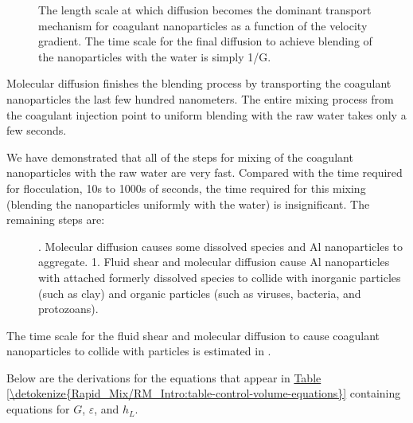 \documentclass[letterpaper,10pt,english]{sphinxmanual}
\let\sphinxpxdimen\pdfpxdimen\else\newdimen\sphinxpxdimen
\begin{document}
\begin{figure}[htbp]
\centering
\capstart

\noindent\sphinxincludegraphics[width=400\sphinxpxdimen]{{Shear_diffusion_length_scale}.png}
\caption{The length scale at which diffusion becomes the dominant transport mechanism for coagulant nanoparticles as a function of the velocity gradient. The time scale for the final diffusion to achieve blending of the nanoparticles with the water is simply 1/G.}\label{\detokenize{Rapid_Mix/RM_Derivations:id5}}\label{\detokenize{Rapid_Mix/RM_Derivations:figure-shear-diffusion-length-scale}}\end{figure}

Molecular diffusion finishes the blending process by transporting the coagulant nanoparticles the last few hundred nanometers. The entire mixing process from the coagulant injection point to uniform blending with the raw water takes only a few seconds.
\begin{description}
\item[{We have demonstrated that all of the steps for mixing of the coagulant nanoparticles with the raw water are very fast. Compared with the time required for flocculation, 10s to 1000s of seconds, the time required for this mixing (blending the nanoparticles uniformly with the water) is insignificant. The remaining steps are:}] . Molecular diffusion causes some dissolved species and Al nanoparticles to aggregate.
1. Fluid shear and molecular diffusion cause Al nanoparticles with attached formerly dissolved species to collide with inorganic particles (such as clay) and organic particles (such as viruses, bacteria, and protozoans).

\end{description}

The time scale for the fluid shear and molecular diffusion to cause coagulant nanoparticles to collide with particles is estimated in {\hyperref[\detokenize{Rapid_Mix/RM_Theory_and_Future_Work:heading-diffusion-and-shear-transport-coagulant-nanoparticles-to-clay}]{}}.

Below are the derivations for the equations that appear in \hyperref[\detokenize{Rapid_Mix/RM_Intro:table-control-volume-equations}]{Table \ref{\detokenize{Rapid_Mix/RM_Intro:table-control-volume-equations}}} containing equations for \(G\), \(\varepsilon\), and \(h_L\).
\end{document}
